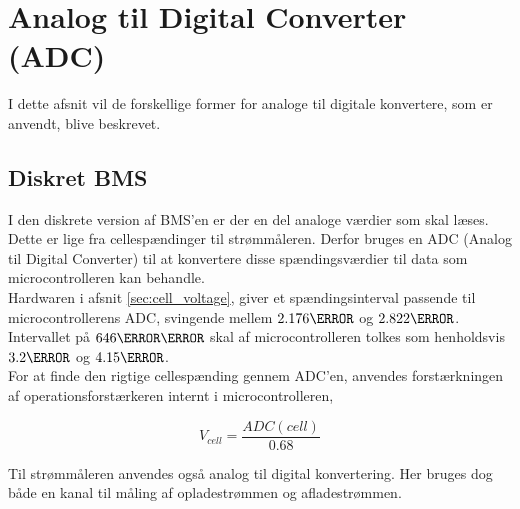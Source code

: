 \section{Analog til Digital Converter (ADC)}
I dette afsnit vil de forskellige former for analoge til digitale konvertere, som er anvendt, blive beskrevet. 

\subsection{Diskret BMS}
I den diskrete version af BMS'en er der en del analoge værdier som skal læses. Dette er lige fra cellespændinger til strømmåleren. Derfor bruges en ADC (Analog til Digital Converter) til at konvertere disse spændingsværdier til data som microcontrolleren kan behandle.
\\

Hardwaren i afsnit \ref{sec:cell_voltage}, giver et spændingsinterval passende til microcontrollerens ADC, svingende mellem $2.176\volt$ og $2.822\volt$. Intervallet på $646\milli\volt$ skal af microcontrolleren tolkes som henholdsvis $3.2\volt$ og $4.15\volt$.
\\

For at finde den rigtige cellespænding gennem ADC'en, anvendes  forstærkningen af operationsforstærkeren internt i microcontrolleren,

\begin {equation}
V_{cell} =  \frac{ADC(cell)}{0.68}
\end {equation}





Til strømmåleren anvendes også analog til digital konvertering. Her bruges dog både en kanal til måling af opladestrømmen og afladestrømmen.
 
